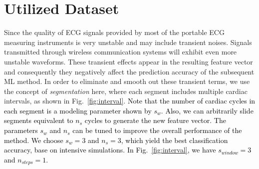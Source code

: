 \section{Utilized Dataset}

Since the quality of ECG signals provided by most of the portable ECG measuring instruments is very unstable and may include transient noises. Signals transmitted through wireless communication systems will exhibit even more unstable waveforms. These transient effects appear in the resulting feature vector and consequently they negatively affect the prediction accuracy of the subsequent ML method. In order to eliminate and smooth out these transient terms, we use the concept of \textit{segmentation} here, where each segment includes multiple cardiac intervals, 
as shown in Fig.~\ref{fig:interval}. \textcolor{black}{Note that the number of cardiac cycles in each segment is a modeling parameter shown by $s_{w}$. Also, we can arbitrarily slide segments equivalent to $n_{s}$ cycles to generate the new feature vector. The parameters $s_{w}$ and $n_{s}$ can be tuned to improve the overall performance of the method. We choose $s_{w}=3$ and $n_{s}=3$, which yield the best classification accuracy, base on intensive simulations. In Fig.~\ref{fig:interval}, we have $s_{window}=3$ and $n_{steps}=1$.}


